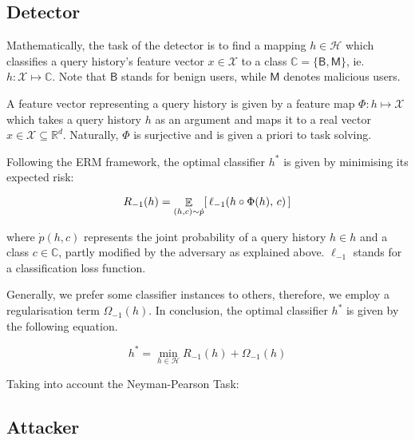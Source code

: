 



\subsection{Detector}


Mathematically, the task of the detector is to find a mapping
$h \in \mathcal{H}$ which classifies a query history’s feature vector
$x \in \mathcal{X}$ to a class
$\mathbb{C} = \{ \mathsf{B}, \mathsf{M} \}$, ie.
$h: \mathcal{X} \mapsto \mathbb{C}$. Note that $\mathsf{B}$ stands
for benign users, while $\mathsf{M}$ denotes malicious users.

A feature vector representing a query history is given by a feature map
$\Phi : h \mapsto \mathcal{X}$ which takes a query history $h$
as an argument and maps it to a real vector
$x \in \mathcal{X} \subseteq \mathbb{R}^d$. Naturally, $\Phi$ is
surjective and is given a priori to task solving.

Following the ERM framework, the optimal classifier $h^*$ is given by
minimising its expected risk:

\begin{equation}
R_{-1}(h) = \mathop{\mathbb{E}}_{(h,c) \sim \dot{p}} [\, \ell_{-1}(h \circ \Phi(h), \, c) \,]
\end{equation}

where $\dot{p}(h,c)$ represents the joint probability of a query
history $h \in h$ and a class $c \in \mathbb{C}$, partly
modified by the adversary as explained above. $\ell_{-1}$ stands for a
classification loss function.

Generally, we prefer some classifier instances to others, therefore, we
employ a regularisation term $\Omega_{-1}(h)$. In conclusion, the
optimal classifier $h^*$ is given by the following equation.

\begin{equation}
h^* = \min_{h \in \mathcal{H}} R_{-1}(h) + \Omega_{-1}(h)
\end{equation}

Taking into account the Neyman-Pearson Task:



\subsection{Attacker}\label{sec:attacker}

